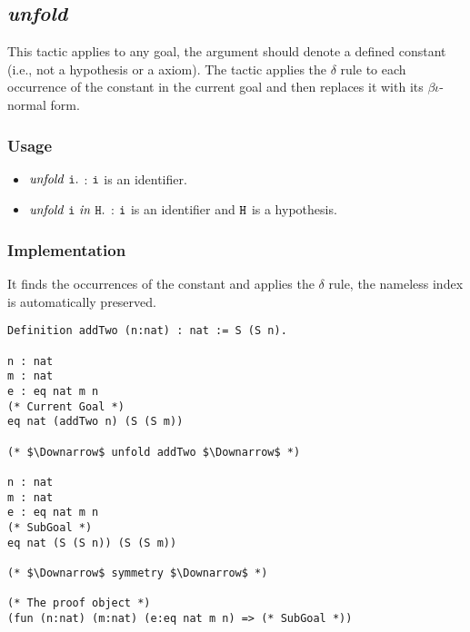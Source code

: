 \subsection{\it unfold}
This tactic applies to any goal, the argument should denote a defined constant (i.e., not a hypothesis or a axiom).
The tactic applies the $\delta$ rule to each occurrence of the constant in the current goal and then replaces it with its $\beta\iota$-normal form.

\subsubsection*{Usage}
\begin{itemize}
\item ${\it unfold}\ \tt i.$ : $\tt i$ is an identifier. 
\item ${\it unfold}\ \tt i\ \it in\ \tt H.$ : $\tt i$ is an identifier and $\tt H$ is a hypothesis.
\end{itemize}

\subsubsection*{Implementation}
It finds the occurrences of the constant and applies the $\delta$ rule, the nameless index is automatically preserved.


\begin{center}
\begin{minipage}{0.8\textwidth}
\begin{verbatim}
Definition addTwo (n:nat) : nat := S (S n).

n : nat
m : nat
e : eq nat m n
(* Current Goal *)
eq nat (addTwo n) (S (S m))

(* $\Downarrow$ unfold addTwo $\Downarrow$ *)

n : nat
m : nat
e : eq nat m n
(* SubGoal *)
eq nat (S (S n)) (S (S m))

(* $\Downarrow$ symmetry $\Downarrow$ *)   

(* The proof object *)
(fun (n:nat) (m:nat) (e:eq nat m n) => (* SubGoal *))                                            
\end{verbatim}
\end{minipage}
\end{center}